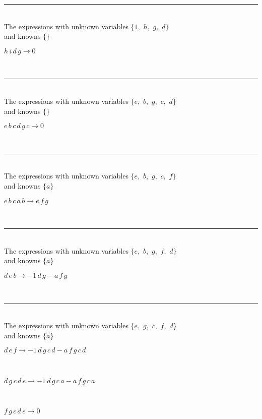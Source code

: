 \rule[3pt]{6in}{.7pt}\\
The expressions with unknown variables $\{1,
$ $
h,
$ $
g,
$ $
d\}$\\
and knowns $\{\}$\smallskip\\
\begin{minipage}{6in}
$
h\,
 i\,
 d\,
 g\rightarrow 0
$
\end{minipage}\\
\rule[3pt]{6in}{.7pt}\\
The expressions with unknown variables $\{e,
$ $
b,
$ $
g,
$ $
c,
$ $
d\}$\\
and knowns $\{\}$\smallskip\\
\begin{minipage}{6in}
$
e\,
 b\,
 c\,
 d\,
 g\,
 c\rightarrow 0
$
\end{minipage}\\
\rule[3pt]{6in}{.7pt}\\
The expressions with unknown variables $\{e,
$ $
b,
$ $
g,
$ $
c,
$ $
f\}$\\
and knowns $\{a\}$\smallskip\\
\begin{minipage}{6in}
$
e\,
 b\,
 c\,
 a\,
 b\rightarrow e\,
 f\,
 g
$
\end{minipage}\\
\rule[3pt]{6in}{.7pt}\\
The expressions with unknown variables $\{e,
$ $
b,
$ $
g,
$ $
f,
$ $
d\}$\\
and knowns $\{a\}$\smallskip\\
\begin{minipage}{6in}
$
d\,
 e\,
 b\rightarrow -1\,
 d\,
 g - a\,
 f\,
 g
$
\end{minipage}\\
\rule[3pt]{6in}{.7pt}\\
The expressions with unknown variables $\{e,
$ $
g,
$ $
c,
$ $
f,
$ $
d\}$\\
and knowns $\{a\}$\smallskip\\
\begin{minipage}{6in}
$
d\,
 e\,
 f\rightarrow -1\,
 d\,
 g\,
 c\,
 d - a\,
 f\,
 g\,
 c\,
 d
$
\end{minipage}\medskip \\
\begin{minipage}{6in}
$
d\,
 g\,
 c\,
 d\,
 e\rightarrow -1\,
 d\,
 g\,
 c\,
 a - a\,
 f\,
 g\,
 c\,
 a
$
\end{minipage}\medskip \\
\begin{minipage}{6in}
$
f\,
 g\,
 c\,
 d\,
 e\rightarrow 0
$
\end{minipage}\\
